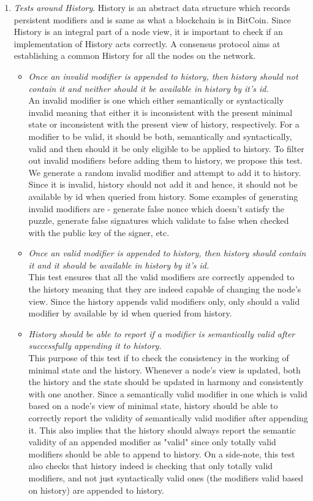 \begin{enumerate}[\IEEEsetlabelwidth{Z}]
\begin{itemize}[]
\end{itemize}
\item \textit{Tests around History}.
History is an abstract data structure which records persistent modifiers and is same as what a blockchain is in BitCoin. Since History is an integral part of a node view, it is important to check if an implementation of History acts correctly. A consensus protocol aims at establishing a common History for all the nodes on the network.
\begin{itemize}[]
\item \textit{Once an invalid modifier is appended to history, then history should not contain it and neither should it be available in history by it's id.}\\
An invalid modifier is one which either semantically or syntactically invalid meaning that either it is inconsistent with the present minimal state or inconsistent with the present view of history, respectively. For a modifier to be valid, it should be both, semantically and syntactically, valid and then should it be only eligible to be applied to history. To filter out invalid modifiers before adding them to history, we propose this test. We generate a random invalid modifier and attempt to add it to history. Since it is invalid, history should not add it and hence, it should not be available by id when queried from history. Some examples of generating invalid modifiers are - generate false nonce which doesn't satisfy the puzzle, generate false signatures which validate to false when checked with the public key of the signer, etc.
\item \textit{Once an valid modifier is appended to history, then history should contain it and it should be available in history by it's id.}\\
This test ensures that all the valid modifiers are correctly appended to the history meaning that they are indeed capable of changing the node's view. Since the history appends valid modifiers only, only should a valid modifier by available by id when queried from history.
\item \textit{History should be able to report if a modifier is semantically valid after successfully appending it to history.}\\
This purpose of this test if to check the consistency in the working of minimal state and the history. Whenever a node's view is updated, both the history and the state should be updated in harmony and consistently with one another. Since a semantically valid modifier in one which is valid based on a node's view of minimal state, history should be able to correctly report the validity of semantically valid modifier after appending it. This also implies that the history should always report the semantic validity of an appended modifier as "valid" since only totally valid modifiers should be able to append to history. On a side-note, this test also checks that history indeed is checking that only totally valid modifiers, and not just syntactically valid ones (the modifiers valid based on history) are appended to history.

\end{itemize}
\end{enumerate}
